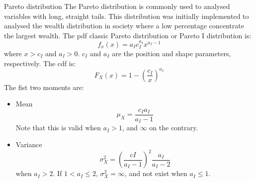 \documentclass[8pt]{beamer}
\renewcommand{\emph}[1]{\textcolor{myorange}{#1}}
\begin{document}
\begin{frame}{Pareto distribution}
    The \alert{Pareto distribution} is commonly used to analysed variables with long, straight tails. This distribution was initially implemented to analysed the wealth distribution in society where a low percentage concentrate the largest wealth. The   \emph{pdf} \emph{classic Pareto distribution} or \emph{Pareto I distribution} is:
    \[
        f_x (x) = a_I c_I^{a_I} x^{a_I -1}
    \]
    where $x > c_I$ and $a_I > 0$. $c_I$ and $a_I$ are the position and shape parameters, respectively. The \emph{cdf} is:
\[
    F_X (x) = 1-\left(\frac{c_I}{x} \right)^{a_I}
\]
    The fist two moments are:
        \begin{itemize}
            \item \emph{Mean}
                \[
                    \mu_X = \frac{c_I a_I}{a_I -1}
                \]
                Note that this is valid when $a_I > 1$, and $\infty$ on the contrary. 

            \item \emph{Variance}
                \[
                    \sigma_X^2 = \left( \frac{cI}{a_I - 1} \right)^2 \frac{a_I}{a_I -2}
                \]
                when $a_I > 2$. If $1 < a_I \leq 2$, $\sigma_X^2 = \infty$, and not exist when $a_I \leq 1$.

        \end{itemize}

\end{frame}
\end{document}
